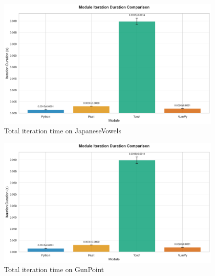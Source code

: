 \documentclass[review]{AIM_report}
\begin{document}
\begin{figure}[H]
    \centering
    \includegraphics[width=\figsize\textwidth]{files/benchmarking/iteration/four/vowel.png}
    \caption{Total iteration time on JapaneseVowels}
    \label{fig:four-vowel-iteration}
\end{figure}
\begin{figure}[H]
    \centering
    \includegraphics[width=\figsize\textwidth]{files/benchmarking/iteration/four/vowel.png}
    \caption{Total iteration time on GunPoint}
    \label{fig:four-gun-iteration}
\end{figure}
\end{document}
